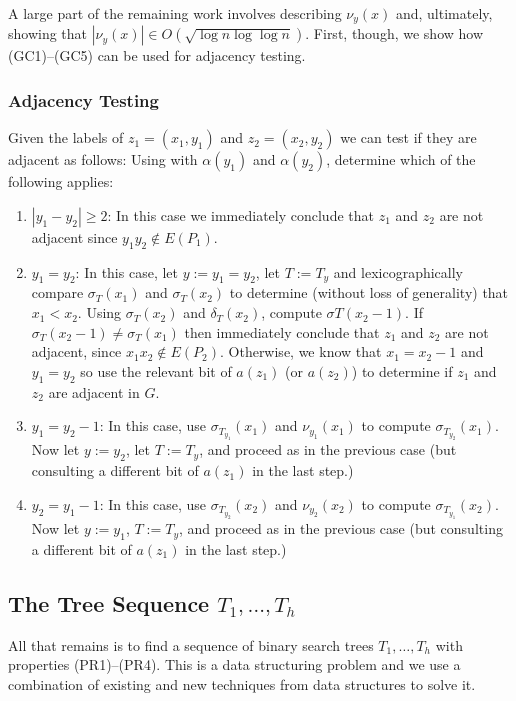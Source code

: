 \documentclass[kpfonts]{patmorin}
\begin{document}
A large part of the remaining work involves describing $\nu_y(x)$ and, ultimately, showing that $|\nu_y(x)|\in O(\sqrt{\log n\log\log n})$. First, though, we show how (GC1)--(GC5) can be used for adjacency testing.

\subsubsection{Adjacency Testing}

Given the labels of $z_1=(x_1,y_1)$ and $z_2=(x_2,y_2)$ we can test if they are adjacent as follows: Using  with $\alpha(y_1)$ and $\alpha(y_2)$, determine which of the following applies:
\begin{enumerate}
  \item $|y_1-y_2|\ge 2$: In this case we immediately conclude that $z_1$ and $z_2$ are not adjacent since $y_1y_2\not\in E(P_1)$.  
  
  \item $y_1=y_2$: In this case, let $y:=y_1=y_2$, let $T:=T_y$ and lexicographically compare $\sigma_T(x_1)$ and $\sigma_T(x_2)$ to determine (without loss of generality) that $x_1<x_2$.  Using $\sigma_{T}(x_2)$ and $\delta_{T}(x_2)$, compute $\sigma{T}(x_2-1)$.  If $\sigma_T(x_2-1)\neq \sigma_T(x_1)$ then immediately conclude that $z_1$ and $z_2$ are not adjacent, since $x_1x_2\not\in E(P_2)$.  Otherwise, we know that $x_1=x_2-1$ and $y_1=y_2$ so use the relevant bit of $a(z_1)$ (or $a(z_2)$) to determine if $z_1$ and $z_2$ are adjacent in $G$.
  
  \item $y_1=y_2-1$: In this case, use $\sigma_{T_{y_1}}(x_1)$ and $\nu_{y_1}(x_1)$ to compute $\sigma_{T_{y_2}}(x_1)$.  Now let $y:=y_2$, let $T:=T_{y}$, and proceed as in the previous case (but consulting a different bit of $a(z_1)$ in the last step.)
  
  \item $y_2=y_1-1$: In this case, use $\sigma_{T_{y_2}}(x_2)$ and $\nu_{y_2}(x_2)$ to compute $\sigma_{T_{y_1}}(x_2)$.  Now let $y:=y_1$, $T:=T_{y}$, and proceed as in the previous case (but consulting a different bit of $a(z_1)$ in the last step.)
\end{enumerate}


\subsection{The Tree Sequence $T_1,\ldots,T_h$}

All that remains is to find a sequence of binary search trees $T_1,\ldots,T_h$ with properties (PR1)--(PR4). This is a data structuring problem and we use a combination of existing and new techniques from data structures to solve it.
\end{document}
